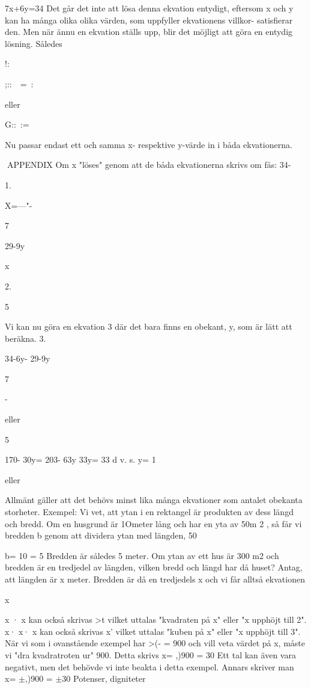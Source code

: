 \documentclass[a4paper,twoside,twocolumn,openright]{book}
\begin{document}
{{{{{7x+6y=34
Det går det inte att lösa denna ekvation
entydigt, eftersom x och y kan ha många
olika olika värden, som uppfyller ekvationens villkor- satisfierar den.
Men när ännu en ekvation ställs upp, blir
det möjligt att göra en entydig lösning.
Således

!:

{;::~~=~:

eller

G::~:=~~

Nu passar endast ett och samma x- respektive y-värde in i båda ekvationerna.

APPENDIX
Om x "löses" genom att de båda
ekvationerna skrivs om fås:
34-

1.

X=---"-

7

29-9y

x

2.

5

Vi kan nu göra en ekvation 3 där det bara
finns en obekant, y, som är lätt att beräkna.
3.

34-6y- 29-9y

7

-

eller

5

170- 30y= 203- 63y
33y= 33 d v. s. y= 1

eller

Allmänt gäller att det behövs minst lika
många ekvationer som antalet obekanta storheter.
Exempel:
Vi vet, att ytan i en rektangel är produkten av
dess längd och bredd.
Om en husgrund är 1Ometer lång och har
en yta av 50m 2 , så får vi bredden b genom
att dividera ytan med längden,
50

b= 10 = 5 Bredden är således 5 meter.
Om ytan av ett hus är 300 m2 och bredden är
en tredjedel av längden, vilken bredd och
längd har då huset?
Antag, att längden är x meter. Bredden är då
en tredjedels x och vi får alltså ekvationen

x

x · x kan också skrivas >t vilket uttalas
"kvadraten på x" eller "x upphöjt till 2".
x· x· x kan också skrivas x' vilket uttalas
"kuben på x" eller "x upphöjt till 3".
När vi som i ovanstående exempel har
>(- = 900 och vill veta värdet på x, måste vi
"dra kvadratroten ur" 900.
Detta skrivs x= ,)900 = 30
Ett tal kan även vara negativt, men det
behövde vi inte beakta i detta exempel.
Annars skriver man x= $\pm$,)900 = $\pm$30
Potenser, digniteter

}}}}}}
\end{document}
